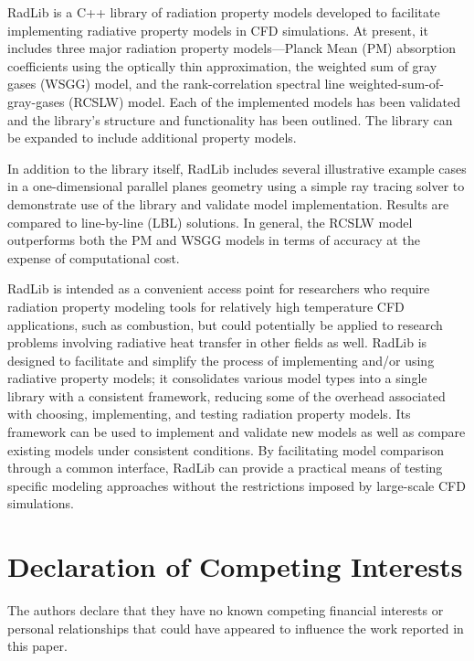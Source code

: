 \documentclass[preprint,12pt]{elsarticle}
\begin{document}
RadLib is a C++ library of radiation property models developed to facilitate implementing radiative property models in CFD simulations. At present, it includes three major radiation property models---Planck Mean (PM) absorption coefficients using the optically thin approximation, the weighted sum of gray gases (WSGG) model, and the rank-correlation spectral line weighted-sum-of-gray-gases (RCSLW) model. Each of the implemented models has been validated and the library's structure and functionality has been outlined. The library can be expanded to include additional property models.

In addition to the library itself, RadLib includes several illustrative example cases in a one-dimensional parallel planes geometry using a simple ray tracing solver to demonstrate use of the library and validate model implementation. Results are compared to line-by-line (LBL) solutions. In general, the RCSLW model outperforms both the PM and WSGG models in terms of accuracy at the expense of computational cost. 

RadLib is intended as a convenient access point for researchers who require radiation property modeling tools for relatively high temperature CFD applications, such as combustion, but could potentially be applied to research problems involving radiative heat transfer in other fields as well. RadLib is designed to facilitate and simplify the process of implementing and/or using radiative property models; it consolidates various model types into a single library with a consistent framework, reducing some of the overhead associated with choosing, implementing, and testing radiation property models. Its framework can be used to implement and validate new models as well as compare existing models under consistent conditions. By facilitating model comparison through a common interface, RadLib can provide a practical means of testing specific modeling approaches without the restrictions imposed by large-scale CFD simulations. 


\section{Declaration of Competing Interests} \label{s:coi}

The authors declare that they have no known competing financial interests or personal relationships that could have appeared to influence the work reported in this paper.
\end{document}
